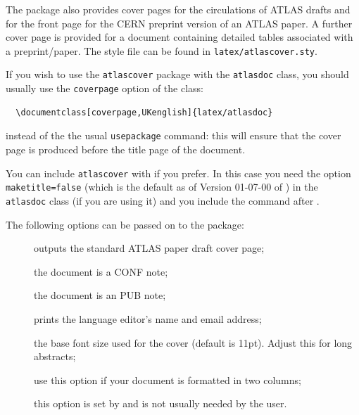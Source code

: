 The package also provides cover pages for the circulations of ATLAS drafts and 
for the front page for the CERN preprint version of an ATLAS paper.
A further cover page is provided for a document containing detailed tables associated with a preprint/paper.
The style file can be found in \texttt{latex/atlascover.sty}.

If you wish to use the \texttt{atlascover} package with the 
\texttt{atlasdoc} class, you should usually use the \texttt{coverpage} option of the class:
\begin{verbatim}
  \documentclass[coverpage,UKenglish]{latex/atlasdoc}
\end{verbatim}
instead of the the usual \texttt{usepackage} command: this will ensure
that the cover page is produced before the title page of the document.

You can include \texttt{atlascover} with  if you prefer.
In this case you need the option \texttt{maketitle=false}
(which is the default as of Version 01-07-00 of ) in the \texttt{atlasdoc} class
(if you are using it)
and you include the  command after \verb||.

The following options can be passed on to the  package:
\begin{description}
\item[] outputs the standard ATLAS paper draft cover page;
\item[] the document is a CONF note;
\item[] the document is an PUB note;
\item[] prints the language editor's name and email address;
\item[] the base font size used for the cover (default is 11pt). Adjust this for long abstracts;
\item[] use this option if your document is formatted in two columns;
\item[] this option is set by  and is not usually needed by the user.
\end{description}


